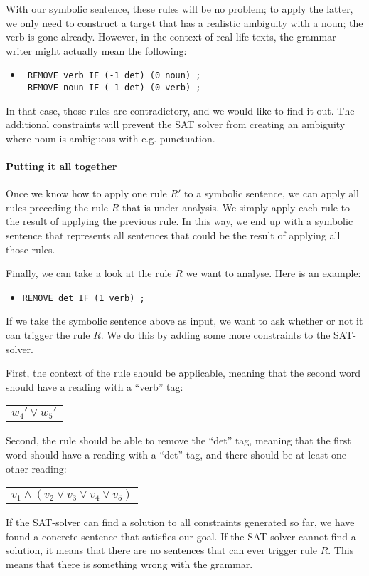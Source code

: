  With our symbolic sentence, these rules will be no problem; to apply the latter, we only need to construct a target that has a realistic ambiguity with a noun; the verb is gone already.
 However, in the context of real life texts, the grammar writer might actually mean the following:

 \begin{itemize}
 \item[] \begin{verbatim}
 REMOVE verb IF (-1 det) (0 noun) ;
 REMOVE noun IF (-1 det) (0 verb) ;
 \end{verbatim}
 \end{itemize}

 In that case, those rules are contradictory, and we would like to find it out. The additional constraints will prevent the SAT solver from creating an ambiguity where noun is ambiguous with e.g. punctuation.


\paragraph{Putting it all together}

Once we know how to apply one rule $R'$ to a symbolic sentence, we can apply all rules preceding the rule $R$ that is under analysis. We simply apply each rule to the result of applying the previous rule. In this way, we end up with a symbolic sentence that represents all sentences that could be the result of applying all those rules.

Finally, we can take a look at the rule $R$ we want to analyse. Here is an example:
\begin{itemize}
\item[] \texttt{REMOVE det IF (1 verb) ;}
\end{itemize}
If we take the symbolic sentence above as input, we want to ask whether or not it can trigger the rule $R$. We do this by adding some more constraints to the SAT-solver.

First, the context of the rule should be applicable, meaning that the second word should have a reading with a ``verb'' tag:
\begin{center}
\begin{tabular}{c}
$w_4' \vee w_5'$
\end{tabular}
\end{center}
Second, the rule should be able to remove the ``det'' tag, meaning that the first word should have a reading with a ``det'' tag, and there should be at least one other reading:
\begin{center}
\begin{tabular}{c}
$v_1 \wedge (v_2 \vee v_3 \vee v_4 \vee v_5)$
\end{tabular}
\end{center}
If the SAT-solver can find a solution to all constraints generated so far, we have found a concrete sentence that satisfies our goal. If the SAT-solver cannot find a solution, it means that there are no sentences that can ever trigger rule $R$. This means that there is something wrong with the grammar.


